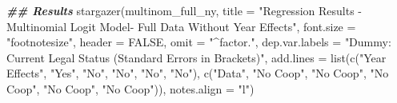 \documentclass[a4paper,nobind]{templates/ociamthesis}
\newenvironment{Shaded}{\begin{snugshade}}{\end{snugshade}}
\newcommand{\AttributeTok}[1]{\textcolor[rgb]{0.77,0.63,0.00}{#1}}
\newcommand{\ConstantTok}[1]{\textcolor[rgb]{0.00,0.00,0.00}{#1}}
\newcommand{\DocumentationTok}[1]{\textcolor[rgb]{0.56,0.35,0.01}{\textbf{\textit{#1}}}}
\newcommand{\FunctionTok}[1]{\textcolor[rgb]{0.00,0.00,0.00}{#1}}
\newcommand{\NormalTok}[1]{#1}
\newcommand{\StringTok}[1]{\textcolor[rgb]{0.31,0.60,0.02}{#1}}
\renewenvironment{Shaded}
{
  \vspace{10pt}%
  \begin{snugshade}%
}{%
  \end{snugshade}%
  \vspace{8pt}%
}
\begin{document}
\begin{Shaded}
\begin{Highlighting}[]
\DocumentationTok{\#\# Results }
\FunctionTok{stargazer}\NormalTok{(multinom\_full\_ny, }\AttributeTok{title =} \StringTok{"Regression Results {-} Multinomial Logit Model{-} Full Data Without Year Effects"}\NormalTok{, }\AttributeTok{font.size =} \StringTok{"footnotesize"}\NormalTok{, }\AttributeTok{header =} \ConstantTok{FALSE}\NormalTok{, }\AttributeTok{omit =} \StringTok{"\^{}factor."}\NormalTok{, }\AttributeTok{dep.var.labels =} \StringTok{"Dummy: Current Legal Status (Standard Errors in Brackets)"}\NormalTok{, }\AttributeTok{add.lines =} \FunctionTok{list}\NormalTok{(}\FunctionTok{c}\NormalTok{(}\StringTok{"Year Effects"}\NormalTok{, }\StringTok{"Yes"}\NormalTok{, }\StringTok{"No"}\NormalTok{, }\StringTok{"No"}\NormalTok{, }\StringTok{"No"}\NormalTok{, }\StringTok{"No"}\NormalTok{), }\FunctionTok{c}\NormalTok{(}\StringTok{"Data"}\NormalTok{, }\StringTok{"No Coop"}\NormalTok{, }\StringTok{"No Coop"}\NormalTok{, }\StringTok{"No Coop"}\NormalTok{, }\StringTok{"No Coop"}\NormalTok{, }\StringTok{"No Coop"}\NormalTok{)), }\AttributeTok{notes.align =} \StringTok{"l"}\NormalTok{)}
\end{Highlighting}
\end{Shaded}
\end{document}
